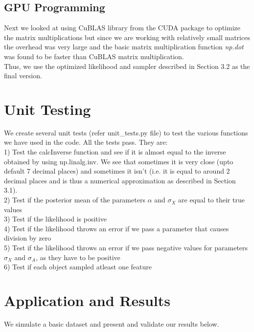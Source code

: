 \documentclass[11pt]{article}
\begin{document}
\subsection{GPU Programming}
Next we looked at using CuBLAS library from the CUDA package to optimize the matrix multiplications but since we are working with relatively small matrices the overhead was very large and the basic matrix multiplication function \textit{np.dot} was found to be faster than CuBLAS matrix multiplication.\\

Thus, we use the optimized likelihood and sampler described in Section 3.2 as the final version.

\section{Unit Testing}
We create several unit tests (refer unit\_tests.py file) to test the various functions we have used in the code. All the tests pass. They are:\\

1) Test the calcInverse function and see if it is almost equal to the inverse obtained by using np.linalg.inv. We see that sometimes it is very close (upto default 7 decimal places) and sometimes it isn't (i.e. it is equal to around 2 decimal places and is thus a numerical approximation as described in Section 3.1).\\

2) Test if the posterior mean of the parameters $\alpha$ and $\sigma_{X}$ are equal to their true values\\

3) Test if the likelihood is positive\\

4) Test if the likelihood throws an error if we pass a parameter that causes division by zero\\

5) Test if the likelihood throws an error if we pass negative values for parameters $\sigma_{X}$ and $\sigma_{A}$, as they have to be positive\\

6) Test if each object sampled atleast one feature 

\section{Application and Results}
We simulate a basic dataset and present and validate our results below.
\end{document}
